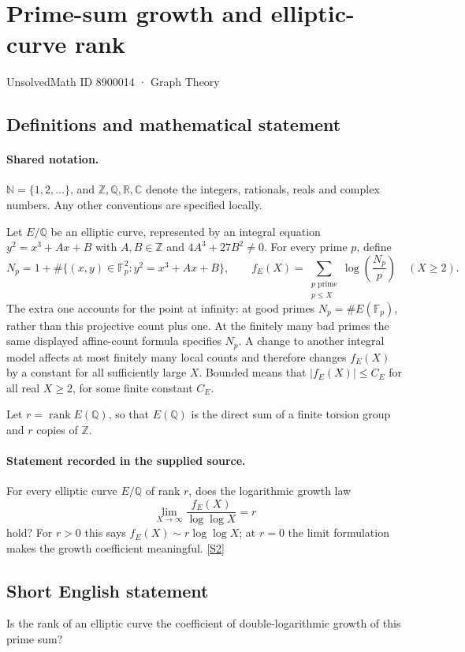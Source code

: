 \documentclass[11pt]{article}
\newcommand{\sref}[2]{\hyperlink{source:#1:#2}{[S#2]}}
\begin{document}
\setcounter{section}{8900013}
\section{Prime-sum growth and elliptic-curve rank}\label{8900014}
{\small\sffamily UnsolvedMath ID 8900014 · Graph Theory}
\subsection{Definitions and mathematical statement}

\paragraph{Shared notation.}$\mathbb N=\{1,2,\ldots\}$, and $\mathbb Z,\mathbb Q,\mathbb R,\mathbb C$ denote the integers, rationals, reals and complex numbers. Any other conventions are specified locally.


Let $E/\mathbb Q$ be an elliptic curve, represented by an integral equation $y^2=x^3+Ax+B$ with $A,B\in\mathbb Z$ and $4A^3+27B^2\ne0$. For every prime $p$, define
\[
N_p=1+\#\{(x,y)\in\mathbb F_p^2:y^2=x^3+Ax+B\},\qquad
f_E(X)=\sum_{\substack{p\text{ prime}\\p\le X}}\log\!\left(\frac{N_p}{p}\right)\quad(X\ge2).
\]
The extra one accounts for the point at infinity: at good primes $N_p=\#E(\mathbb F_p)$, rather than this projective count plus one. At the finitely many bad primes the same displayed affine-count formula specifies $N_p$. A change to another integral model affects at most finitely many local counts and therefore changes $f_E(X)$ by a constant for all sufficiently large $X$. Bounded means that $|f_E(X)|\le C_E$ for all real $X\ge2$, for some finite constant $C_E$.\par Let $r=\operatorname{rank}E(\mathbb Q)$, so that $E(\mathbb Q)$ is the direct sum of a finite torsion group and $r$ copies of $\mathbb Z$.
\paragraph{Statement recorded in the supplied source.}
For every elliptic curve $E/\mathbb Q$ of rank $r$, does the logarithmic growth law
\[
\lim_{X\to\infty}\frac{f_E(X)}{\log\log X}=r
\]
hold? For $r>0$ this says $f_E(X)\sim r\log\log X$; at $r=0$ the limit formulation makes the growth coefficient meaningful. \sref{8900014}{2}
\subsection{Short English statement}
Is the rank of an elliptic curve the coefficient of double-logarithmic growth of this prime sum?
\end{document}
